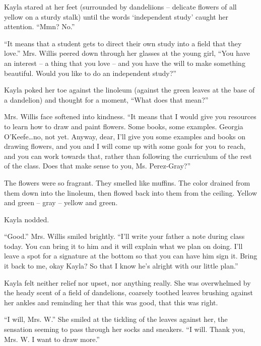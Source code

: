 Kayla stared at her feet (surrounded by dandeliions -- delicate flowers of all yellow on a sturdy stalk) until the words `independent study' caught her attention.  ``Mmn?  No.''

``It means that a student gets to direct their own study into a field that they love.''  Mrs. Willis peered down through her glasses at the young girl, ``You have an interest -- a thing that you love -- and you have the will to make something beautiful.  Would you like to do an independent study?''

Kayla poked her toe against the linoleum (against the green leaves at the base of a dandelion) and thought for a moment, ``What does that mean?''

Mrs. Willis face softened into kindness.  ``It means that I would give you resources to learn how to draw and paint flowers.  Some books, some examples.  Georgia O'Keefe\ldots{}no, not yet.  Anyway, dear, I'll give you some examples and books on drawing flowers, and you and I will come up with some goals for you to reach, and you can work towards that, rather than following the curriculum of the rest of the class.  Does that make sense to you, Ms. Perez-Gray?''

The flowers were so fragrant.  They smelled like muffins.  The color drained from them down into the linoleum, then flowed back into them from the ceiling.  Yellow and green -- gray -- yellow and green.

Kayla nodded.

``Good.''  Mrs. Willis smiled brightly.  ``I'll write your father a note during class today.  You can bring it to him and it will explain what we plan on doing.  I'll leave a spot for a signature at the bottom so that you can have him sign it.  Bring it back to me, okay Kayla?  So that I know he's alright with our little plan.''

Kayla felt neither relief nor upset, nor anything really.  She was overwhelmed by the heady scent of a field of dandelions, coarsely toothed leaves brushing against her ankles and reminding her that this was good, that this was right.

``I will, Mrs. W.''  She smiled at the tickling of the leaves against her, the sensation seeming to pass through her socks and sneakers.  ``I will.  Thank you, Mrs. W.  I want to draw more.''
